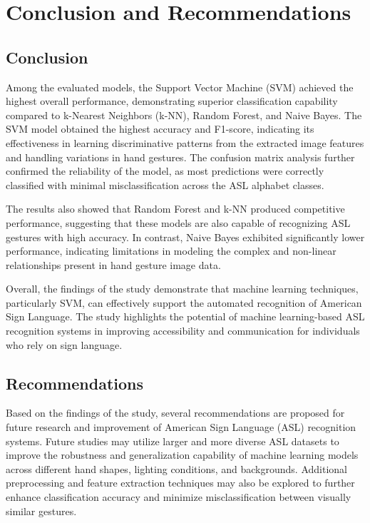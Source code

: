 \section{Conclusion and Recommendations}

\subsection{Conclusion}
Among the evaluated models, the Support Vector Machine (SVM) achieved the highest overall performance, demonstrating superior classification capability compared to k-Nearest Neighbors (k-NN), Random Forest, and Naive Bayes. The SVM model obtained the highest accuracy and F1-score, indicating its effectiveness in learning discriminative patterns from the extracted image features and handling variations in hand gestures. The confusion matrix analysis further confirmed the reliability of the model, as most predictions were correctly classified with minimal misclassification across the ASL alphabet classes.

The results also showed that Random Forest and k-NN produced competitive performance, suggesting that these models are also capable of recognizing ASL gestures with high accuracy. In contrast, Naive Bayes exhibited significantly lower performance, indicating limitations in modeling the complex and non-linear relationships present in hand gesture image data.

Overall, the findings of the study demonstrate that machine learning techniques, particularly SVM, can effectively support the automated recognition of American Sign Language. The study highlights the potential of machine learning-based ASL recognition systems in improving accessibility and communication for individuals who rely on sign language.

\subsection{Recommendations}

Based on the findings of the study, several recommendations are proposed for future research and improvement of American Sign Language (ASL) recognition systems. Future studies may utilize larger and more diverse ASL datasets to improve the robustness and generalization capability of machine learning models across different hand shapes, lighting conditions, and backgrounds. Additional preprocessing and feature extraction techniques may also be explored to further enhance classification accuracy and minimize misclassification between visually similar gestures.

